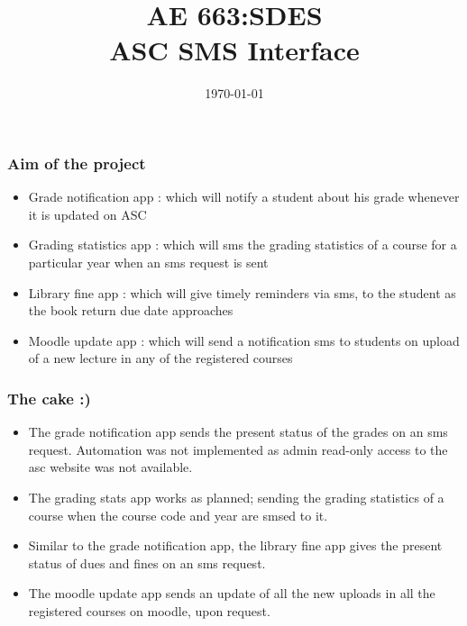 \documentclass[]{beamer}
\title{AE 663:SDES\\
ASC SMS Interface\\}    %
\author[Avnish,Giri,Saket,Pushkar]{}
\institute[Aerospace Engineering Department]{
  \begin{tabular} { l c}
  09001007 & Avnish Kumar\\
  09001008 & Giri Prashant\\                                                                                                                   
  09D02007 & Saket Choudhary\\
  09D01005 & Pushkar Godbole \\
  Group & 1\\
   \end{tabular}
  }
\date{\today}
\begin{document}
\begin{frame}
  \titlepage
\end{frame}


\begin{frame}
	\frametitle{Aim of the project}   
    \begin{itemize}
	\justifying
	\item \color{green} Grade notification app \color{black} : which will notify a student about his grade whenever it is updated on ASC
	\item \color{green} Grading statistics app \color{black} : which will sms the grading statistics of a course for a particular year when an sms request is sent
	\item \color{green} Library fine app \color{black} : which will give timely reminders via sms, to the student as the book return due date approaches
	\item \color{green} Moodle update app \color{black} : which will send a notification sms to students on upload of a new lecture in any of the registered courses
	\end{itemize}
\end{frame}

\begin{frame}
	\frametitle{The cake :)}   
  	\begin{itemize}
	\justifying
	\item  The grade notification app sends the present status of the grades on an sms request. Automation was not implemented as admin read-only access to the asc
 website was not available.
	\item The grading stats app works as planned; sending the grading statistics of a course when the course code and year are smsed to it.
	\item Similar to the grade notification app, the library fine app gives the present status of dues and fines on an sms request.
	\item The moodle update app sends an update of all the new uploads in all the registered courses on moodle, upon request.
  	\end{itemize}
\end{frame}
\end{document}
